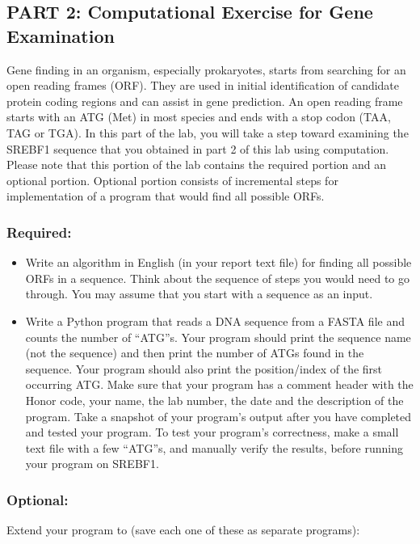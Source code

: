 \vspace*{-.1in}
\subsection*{PART 2: Computational Exercise for Gene Examination}
\vspace*{-.1in} 

Gene finding in an organism, especially prokaryotes, starts from searching for an open reading frames (ORF). They are used in initial identification of candidate protein coding regions and can assist in gene prediction. An open reading frame starts with an ATG (Met) in most species and ends with a stop codon (TAA, TAG or TGA). In this part of the lab, you will take a step toward examining the SREBF1 sequence that you obtained in part 2 of this lab using computation. Please note that this portion of the lab contains the required portion and an optional portion. Optional portion consists of incremental steps for implementation of a program that would find all possible ORFs. 

\subsubsection*{Required:}
\color{red}
\begin{itemize}
	\item Write an algorithm in English (in your report text file) for finding all possible ORFs in a sequence. Think about the sequence of steps you would need to go through. You may assume that you start with a sequence as an input.
	\item Write a Python program that reads a DNA sequence from a FASTA file and counts the number of ``ATG''s. Your program should print the sequence name (not the sequence) and then print the number of ATGs found in the sequence. Your program should also print the position/index of the first occurring ATG. Make sure that your program has a comment header with the Honor code, your name, the lab number, the date and the description of the program. Take a snapshot of your program's output after you have completed and tested your program. To test your program's correctness, make a small text file with a few ``ATG''s, and manually verify the results, before running your program on SREBF1.
\end{itemize}
\color{black}

\subsubsection*{Optional:}
Extend your program to (save each one of these as separate programs):

